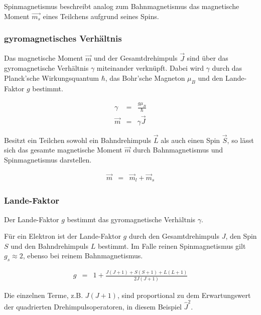 \documentclass[12pt,a4paper]{scrartcl}
\numberwithin{equation}{section} %
\renewcommand{\[}{} %
\renewcommand{\]}{\noindent} %
\begin{document}
Spinmagnetismus beschreibt analog zum Bahnmagnetismus das magnetische
Moment \(\vec{m_{s}}\) eines Teilchens aufgrund seines Spins.

\hypertarget{gyromagnetisches-verhuxe4ltnis}{%
\subsubsection{gyromagnetisches
Verhältnis}\label{gyromagnetisches-verhuxe4ltnis}}

Das magnetische Moment \(\vec{m}\) und der Gesamtdrehimpuls \(\vec{J}\)
sind über das gyromagnetische Verhältnis \(\gamma\) miteinander
verknüpft. Dabei wird \(\gamma\) durch das Planck'sche Wirkungsquantum
\(\hbar\), das Bohr'sche Magneton \(\mu_{B}\) und den Lande-Faktor \(g\)
bestimmt.

\[
\begin{eqnarray}
    \gamma &=& \frac{g\mu_B}{\hbar} \\
    \vec{m} &=& \gamma \vec{J}
\end{eqnarray}
\]

Besitzt ein Teilchen sowohl ein Bahndrehimpuls \(\vec L\) als auch einen
Spin \(\vec S\), so lässt sich das gesamte magnetische Moment
\(\vec{m}\) durch Bahnmagnetismus und Spinmagnetismus darstellen.

\[
\begin{eqnarray}
    \vec m &=& \vec m_l + \vec m_s
\end{eqnarray}
\]

\hypertarget{lande-faktor}{%
\subsubsection{Lande-Faktor}\label{lande-faktor}}

Der Lande-Faktor \(g\) bestimmt das gyromagnetische Verhältnis
\(\gamma\).

Für ein Elektron ist der Lande-Faktor \(g\) durch den Gesamtdrehimpuls
\(J\), den Spin \(S\) und den Bahndrehimpuls \(L\) bestimmt. Im Falle
reinen Spinmagnetismus gilt \(g_{s} \approx 2\), ebenso bei reinem
Bahnmagnetismus.

\[
\begin{eqnarray}
    g &=& 1 + \frac{J(J+1) + S(S+1) + L(L+1)}{2J(J+1)}
\end{eqnarray}
\]

Die einzelnen Terme, z.B. \(J(J+1)\), sind proportional zu dem
Erwartungswert der quadrierten Drehimpulsoperatoren, in diesem Beispiel
\(\hat J^2\).
\end{document}
